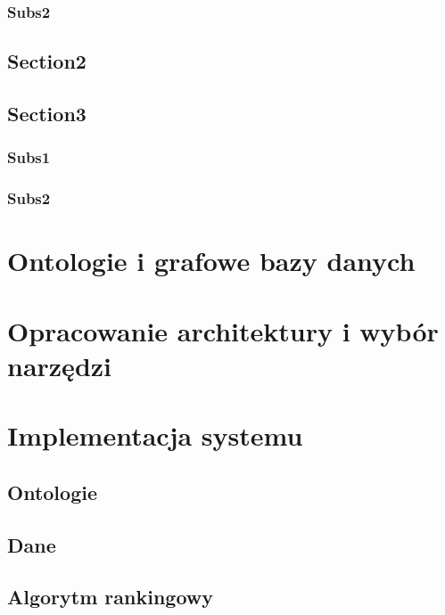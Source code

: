 \documentclass[a4paper,12pt,oneside]{book} %
\begin{document}
\subsection{Subs2}
\lipsum[1]

\section{Section2}
\lipsum[1]

\section{Section3}
\lipsum[1]

\subsection{Subs1}
\lipsum[1]

\subsection{Subs2}
\lipsum[1]

\chapter{Ontologie i grafowe bazy danych}
\lipsum[1]

\chapter{Opracowanie architektury i wybór narzędzi}
\lipsum[1]

\chapter{Implementacja systemu}
\lipsum[1]

\section{Ontologie}
\lipsum[1]

\section{Dane}
\lipsum[1]

\section{Algorytm rankingowy}
\lipsum[1]
\end{document}
